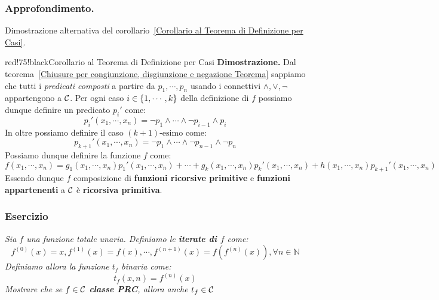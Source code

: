 \subsubsection*{Approfondimento.} Dimostrazione alternativa del corollario~\ref{Corollario al Teorema di Definizione per Casi}.

\begin{halfframedbox}{red!75!black}{Corollario al Teorema di Definizione per Casi}\label{Corollario al Teorema di Definizione per Casi AltDim}
    \textbf{Dimostrazione. } Dal teorema~\ref{Chiusure per congiunzione, disgiunzione e negazione Teorema} sappiamo che tutti i \textit{predicati composti} a partire da \(p_1,\cdots,p_n\) usando i connettivi \(\land,\lor,\neg\) appartengono a \(\mathcal{C}\).
  Per ogni caso \(i\in \displaystyle{\left\{{1,\cdots,k}\right\}}\) della definizione di \(f\) possiamo dunque definire un predicato \(p_i'\) come:
  \begin{equation}
    p_i'(x_1,\cdots,x_n)=\neg p_1 \land \cdots \land \neg p_{i-1} \land p_i
  \end{equation}
  In oltre possiamo definire il caso \((k+1)\text{-esimo}\) come:
  \begin{equation}
    p_{k+1}'(x_1,\cdots,x_n)=\neg p_1 \land \cdots \land \neg p_{n-1} \land \neg p_n
  \end{equation}
  Possiamo dunque definire la funzione \(f\) come:
  \begin{equation}
    f(x_1,\cdots,x_n)=g_1(x_1,\cdots,x_n)p_1'(x_1,\cdots,x_n)+\cdots+g_k(x_1,\cdots,x_n)p_k'(x_1,\cdots,x_n)+h(x_1,\cdots,x_n)p_{k+1}'(x_1,\cdots,x_n)
  \end{equation}
  Essendo dunque \(f\) composizione di \textbf{funzioni ricorsive primitive} e \textbf{funzioni appartenenti} a \(\mathcal{C}\) è \textbf{ricorsiva primitiva}.
\end{halfframedbox}

\subsubsection*{Esercizio} \textit{Sia \(f\) una funzione totale unaria. Definiamo le \textbf{iterate di \(f\)} come:}
\begin{equation}
    f^{(0)}(x)=x, f^{(1)}(x)=f(x),\cdots, f^{(n+1)}(x)=f(f^{(n)}(x)), \forall n \in \mathbb{N}
    \label{Iterate di f Eq}
\end{equation}
\textit{Definiamo allora la funzione \(t_f\) binaria come:}
\begin{equation}
    t_f(x,n)=f^{(n)}(x)
    \label{Funzione iterata n-esima di f Eq}
\end{equation}
\textit{Mostrare che se \(f \in \mathcal{C}\) \textbf{classe PRC}, allora anche \(t_f\in\mathcal{C}\)}


